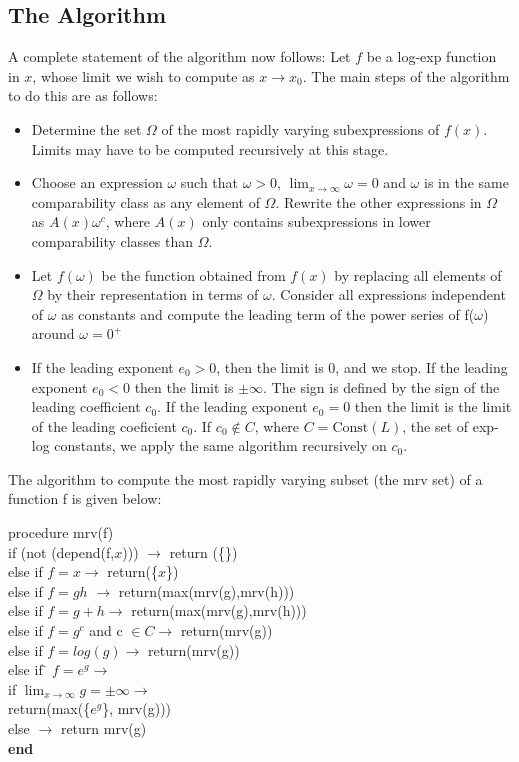 \subsection{The Algorithm}
A complete statement of the algorithm now follows:
Let $f$ be a log-exp function in $x$, whose limit we wish to compute as $x\rightarrow x_0.$ The main steps of the algorithm to do this are as follows:
\begin{itemize}
\item{Determine the set $\Omega$ of the most rapidly varying subexpressions of $f(x)$. Limits may have to be computed recursively at this stage.}
\item{Choose an expression $\omega$ such that $\omega>0$, $\lim_{x \rightarrow \infty} \omega=0 $ and $\omega$ is in the same comparability class as any element of $\Omega$. Rewrite the other expressions in $\Omega$ as $A(x)\omega^{c}$, where $A(x)$ only contains subexpressions in lower comparability classes than $\Omega$.}
\item{Let $f(\omega)$ be the function obtained from $f(x)$ by replacing all elements of $\Omega $ by their representation in terms of $\omega$. Consider all expressions independent of $\omega$ as constants and compute the leading term of the power series of f($\omega$) around $\omega=0^{+}$ }
\item{If the leading exponent $e_0>0$, then the limit is 0, and we stop. If the leading exponent $e_0<0$ then the limit is $\pm \infty$. The sign is defined by the sign of the leading coefficient $c_0$. If the leading exponent $e_0=0$ then the limit is the limit of the leading coeficient $c_0$. If $c_0\not \in C$, where $C=\text{Const}(L)$, the set of exp-log constants, we apply the same algorithm recursively on $c_0$.}
\end{itemize}
The algorithm to compute the most rapidly varying subset (the mrv set) of a function f is given below:
\begin{tabbing}      
procedure mrv(f) \= \\ %
  if (not (depend(f,$x$)))  $\rightarrow$ return (\{\}) \\
  \> else if $f=x \rightarrow$   return(\{$x$\}) \\
 \> else if $f=gh$  $\rightarrow$   return(max(mrv(g),mrv(h))) \\
  else if $f=g+h\rightarrow$   return(max(mrv(g),mrv(h))) \\
  else if $f=g^{c}$ and c $\in C \rightarrow$   return(mrv(g)) \\
  else if $f=log(g)\rightarrow$   return(mrv(g)) \\
  else if \= $f=e^{g}\rightarrow$  \\
   \>   if $\lim_{x \rightarrow \infty} g=\pm\infty \rightarrow$ \\
   \>        return(max(\{$e^{g}$\}, mrv(g))) \\
    \>  else $\rightarrow $ return mrv(g) \\
\textbf{end}
\end{tabbing}


